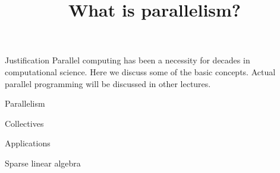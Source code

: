 \documentclass[11pt]{beamer}
\begin{document}
\title{What is parallelism?}
\author{\hpcteachers}
\date{\hpcsemester}

\begin{frame}
  \titlepage
\end{frame}

\begin{frame}{Justification}
  Parallel computing has been a necessity for decades in computational science.
  Here we discuss some of the basic concepts.
  Actual parallel programming will be discussed in other lectures.
\end{frame}

 {Parallelism}


 {Collectives}


 {Applications}


 {Sparse linear algebra}


\end{document}
